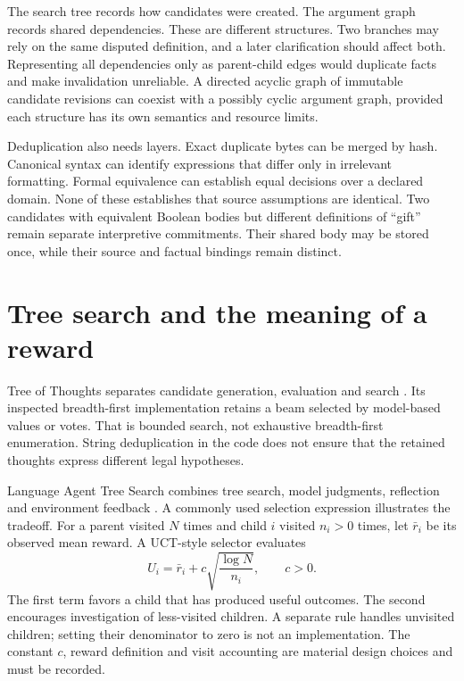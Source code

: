 The search tree records how candidates were created. The argument graph records
shared dependencies. These are different structures. Two branches may rely on
the same disputed definition, and a later clarification should affect both.
Representing all dependencies only as parent-child edges would duplicate facts
and make invalidation unreliable. A directed acyclic graph of immutable candidate
revisions can coexist with a possibly cyclic argument graph, provided each
structure has its own semantics and resource limits.

Deduplication also needs layers. Exact duplicate bytes can be merged by hash.
Canonical syntax can identify expressions that differ only in irrelevant
formatting. Formal equivalence can establish equal decisions over a declared
domain. None of these establishes that source assumptions are identical. Two
candidates with equivalent Boolean bodies but different definitions of ``gift''
remain separate interpretive commitments. Their shared body may be stored once,
while their source and factual bindings remain distinct.

\section{Tree search and the meaning of a reward}

Tree of Thoughts separates candidate generation, evaluation and search
\citep[section 3]{treeofthoughts2023}. Its inspected breadth-first implementation
retains a beam selected by model-based values or votes. That is bounded search,
not exhaustive breadth-first enumeration. String deduplication in the code does
not ensure that the retained thoughts express different legal hypotheses.

Language Agent Tree Search combines tree search, model judgments, reflection and
environment feedback \citep[sections 3.2--4 and appendix A]{lats2024}. A commonly
used selection expression illustrates the tradeoff. For a parent visited $N$
times and child $i$ visited $n_i>0$ times, let $\bar r_i$ be its observed mean
reward. A UCT-style selector evaluates
\begin{equation}
 U_i=\bar r_i+c\sqrt{\frac{\log N}{n_i}},\qquad c>0.
 \label{eq:uct}
\end{equation}
The first term favors a child that has produced useful outcomes. The second
encourages investigation of less-visited children. A separate rule handles
unvisited children; setting their denominator to zero is not an implementation.
The constant $c$, reward definition and visit accounting are material design
choices and must be recorded.

